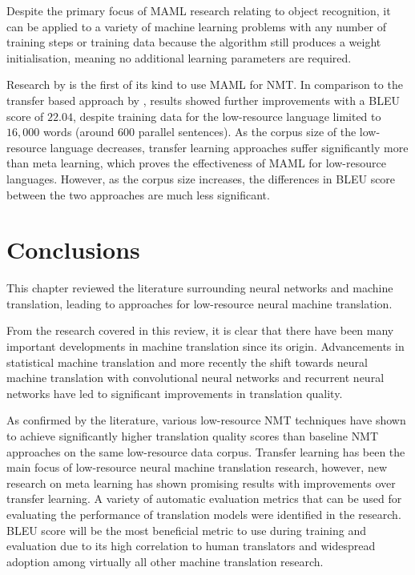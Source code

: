 Despite the primary focus of \acrshort{MAML} research relating to object recognition, it can be applied to a variety of machine learning problems with any number of training steps or training data because the algorithm still produces a weight initialisation, meaning no additional learning parameters are required.


Research by \cite{gu_meta-learning_2018} is the first of its kind to use \acrshort{MAML} for \acrshort{NMT}. In comparison to the transfer based approach by \cite{zoph_transfer_2016}, results showed further improvements with a BLEU score of $22.04$, despite training data for the low-resource language limited to $16,000$ words (around $600$ parallel sentences). As the corpus size of the low-resource language decreases, transfer learning approaches suffer significantly more than meta learning, which proves the effectiveness of \acrshort{MAML} for low-resource languages. However, as the corpus size increases, the differences in BLEU score between the two approaches are much less significant.

\section{Conclusions}

This chapter reviewed the literature surrounding neural networks and machine translation, leading to approaches for low-resource neural machine translation. 

From the research covered in this review, it is clear that there have been many important developments in machine translation since its origin. Advancements in statistical machine translation and more recently the shift towards neural machine translation with convolutional neural networks and recurrent neural networks have led to significant improvements in translation quality.

As confirmed by the literature, various low-resource \acrshort{NMT} techniques have shown to achieve significantly higher translation quality scores than baseline \acrshort{NMT} approaches on the same low-resource data corpus. Transfer learning has been the main focus of low-resource neural machine translation research, however, new research on meta learning has shown promising results with improvements over transfer learning. A variety of automatic evaluation metrics that can be used for evaluating the performance of translation models were identified in the research. \acrshort{BLEU} score will be the most beneficial metric to use during training and evaluation due to its high correlation to human translators and widespread adoption among virtually all other machine translation research.

